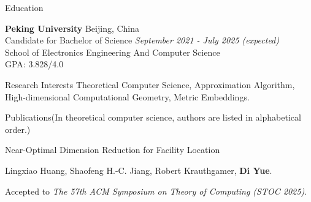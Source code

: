 \documentclass{resume} %
\begin{document}

\begin{rSection}{Education}

{\bf Peking University} \hfill {Beijing, China} 
\\ Candidate for Bachelor of Science \hfill {\em September 2021 - July 2025 (expected)}
\\ School of Electronics Engineering And Computer Science
\\ GPA: 3.828/4.0



\end{rSection}

\begin{rSection}{Research Interests}{}
Theoretical Computer Science, Approximation Algorithm, High-dimensional Computational Geometry, Metric Embeddings.
\end{rSection}

\begin{rSection}{Publications}{(In theoretical computer science, authors are listed in alphabetical order.)}

    \begin{pubSubsection}{Near-Optimal Dimension Reduction for Facility Location}
        \item Lingxiao Huang, Shaofeng H.-C. Jiang, Robert Krauthgamer, \textbf{Di Yue}.
        \item Accepted to \emph{The 57th ACM Symposium on Theory of Computing (STOC 2025)}.
    \end{pubSubsection}
\end{rSection}
\end{document}
